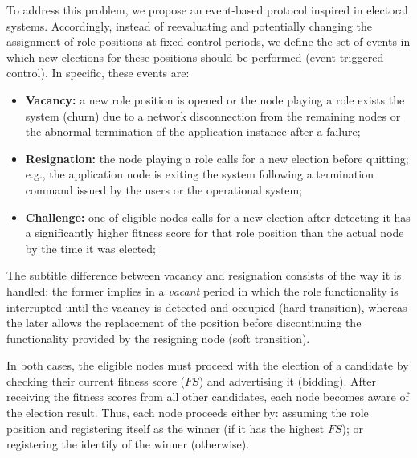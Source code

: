 
To address this problem, we propose an event-based protocol inspired in electoral systems. Accordingly, instead of reevaluating and potentially changing the assignment of role positions at fixed control periods, we define the set of events in which new elections for these positions should be performed (event-triggered control). In specific, these events are:	

\begin{itemize}
	
	\item \textbf{Vacancy:} a new role position is opened or the node playing a role exists the system (churn) due to a network disconnection from the remaining nodes or the abnormal termination of the application instance after a failure;
	
	\item \textbf{Resignation:} the node playing a role calls for a new election before quitting; e.g., the application node is exiting the system following a termination command issued by the users or the operational system;
	
	\item \textbf{Challenge:} one of eligible nodes calls for a new election after detecting it has a significantly higher fitness score for that role position than the actual node by the time it was elected;
	
	
\end{itemize}
\medskip
 
The subtitle difference between vacancy and resignation consists of the way it is handled: the former implies in a \textit{vacant} period in which the role functionality is interrupted until the vacancy is detected and occupied (hard transition), whereas the later allows the replacement of the position before discontinuing the functionality provided by the resigning node (soft transition). 

In both cases, the eligible nodes must proceed with the election of a candidate by checking their current fitness score ($FS$) and advertising it (bidding). After receiving the fitness scores from all other candidates, each node becomes aware of the election result. Thus, each node proceeds either by: assuming the role position and registering itself as the winner (if it has the highest $FS$); or registering the identify of the winner (otherwise). 

